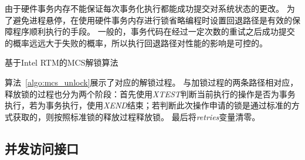 由于硬件事务内存不能保证每次事务化执行都能成功提交对系统状态的更改。
为了避免进程悬停，在使用硬件事务内存进行锁省略编程时设置回退路径是有效的保障程序顺利执行的手段。
一般的，事务代码在经过一定次数的重试之后成功提交的概率远远大于失败的概率，所以执行回退路径对性能的影响是可控的。

\begin{algorithm}[htbp]
\SetAlgoLined
{}

\caption{基于Intel RTM的MCS解锁算法}
\label{algo:mcs_unlock}
\end{algorithm}

算法~\ref{algo:mcs_unlock}展示了对应的解锁过程。
与加锁过程的两条路径相对应，释放锁的过程也分为两个阶段：首先使用\textit{XTEST}判断当前执行的操作是否为事务执行，若为事务执行，使用\textit{XEND}结束；若判断此次操作申请的锁是通过标准的方式获取的，则按照标准锁的释放过程释放锁。
最后将\textit{retries}变量清零。

\subsection{并发访问接口}

